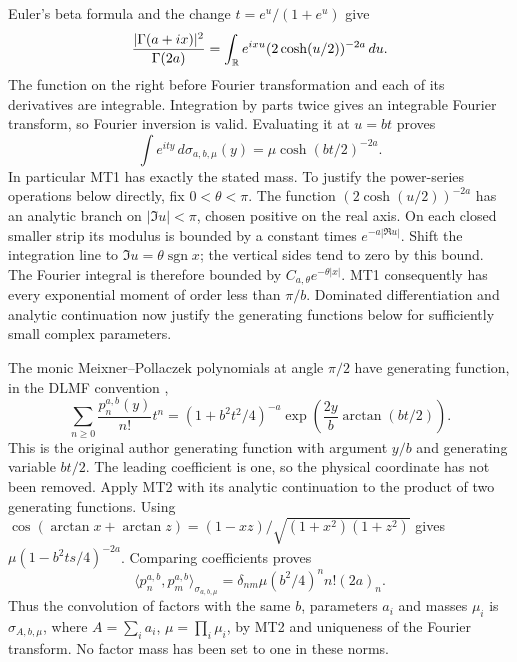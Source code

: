\documentclass[11pt]{article}
\begin{document}
Euler's beta formula \cite{MTBeta} and the change
$t=e^u/(1+e^u)$ give
\[
 \frac{|\Gamma(a+ix)|^2}{\Gamma(2a)}
 =\int_{\mathbb R}e^{ixu}(2\cosh(u/2))^{-2a}\,d u.
\]
The function on the right before Fourier transformation and each of
its derivatives are integrable. Integration by parts twice gives an
integrable Fourier transform, so Fourier inversion is valid. Evaluating
it at $u=bt$ proves
\begin{equation}\tag{MT2}
 \int e^{ity}\,d\sigma_{a,b,\mu}(y)
 =\mu\cosh(bt/2)^{-2a}.
\end{equation}
In particular MT1 has exactly the stated mass. To justify the
power-series operations below directly, fix $0<\theta<\pi$.
The function $(2\cosh(u/2))^{-2a}$ has an analytic branch on
$|\Im u|<\pi$, chosen positive on the real axis. On each closed
smaller strip its modulus is bounded by a constant times
$e^{-a|\Re u|}$. Shift the integration line to
$\Im u=\theta\operatorname{sgn}x$; the vertical sides tend to zero
by this bound. The Fourier integral is therefore bounded by
$C_{a,\theta}e^{-\theta|x|}$. MT1 consequently has every exponential
moment of order less than $\pi/b$. Dominated differentiation and
analytic continuation now justify the generating functions below
for sufficiently small complex parameters.

The monic Meixner--Pollaczek polynomials at angle $\pi/2$ have generating
function, in the DLMF convention \cite{MTMP},
\begin{equation}\tag{MT3}
 \sum_{n\ge0}\frac{p_n^{a,b}(y)}{n!}t^n
 =(1+b^2t^2/4)^{-a}
  \exp\left(\frac{2y}{b}\arctan(bt/2)\right).
\end{equation}
This is the original author generating function with argument $y/b$
and generating variable $bt/2$. The leading coefficient is one,
so the physical coordinate has not been removed. Apply MT2 with its
analytic continuation to the product of two generating functions.
Using $\cos(\arctan x+\arctan z)=(1-xz)/\sqrt{(1+x^2)(1+z^2)}$
gives $\mu(1-b^2ts/4)^{-2a}$. Comparing coefficients proves
\begin{equation}\tag{MT4}
 \langle p_n^{a,b},p_m^{a,b}\rangle_{\sigma_{a,b,\mu}}
 =\delta_{nm}\mu(b^2/4)^n n!(2a)_n.
\end{equation}
Thus the convolution of factors with the same $b$, parameters $a_i$
and masses $\mu_i$ is $\sigma_{A,b,\mu}$, where
$A=\sum_i a_i$, $\mu=\prod_i\mu_i$, by MT2 and uniqueness of the
Fourier transform. No factor mass has been set to one in these norms.
\end{document}
